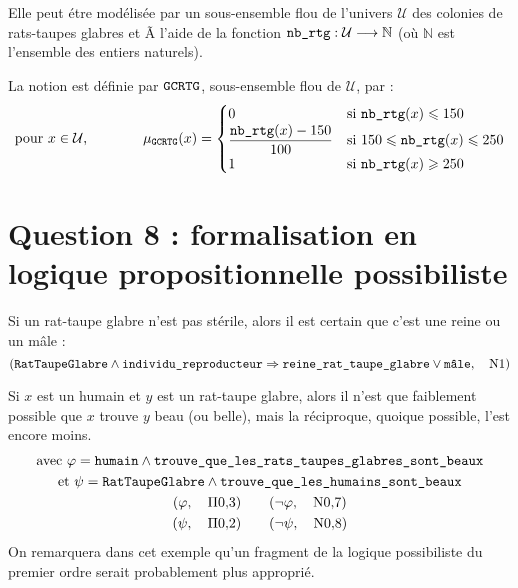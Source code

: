 \documentclass[11pt, a4paper]{article}
\def\fm#1{\text{\texttt{#1}}}
\def\limplique{\Rightarrow}
\def\Univers{{\mathcal{U}}}
\def\dans{\longrightarrow}
\def\Entiers{\mathbb{N}}
\begin{document}
	Elle peut étre modélisée par un sous-ensemble flou de l'univers $\Univers$
	des colonies de rats-taupes glabres et Ã  l'aide de la fonction
	$\nbRTG : \Univers \dans \Entiers$
	(où $\Entiers$ est l'ensemble des entiers naturels).
	
	La notion est définie par $\GCRTG$, sous-ensemble flou de $\Univers$, par :
	\begin{equation*}
	\text{pour $x\in\Univers$,}
	\qquad\qquad
	\mu_{\GCRTG}(x) =
	\begin{cases}
	0 & \text{si $\nbRTG(x) \leqslant 150$}
	\\
	\displaystyle\frac{\nbRTG(x)-150}{100}
	& \text{si $150 \leqslant \nbRTG(x) \leqslant 250$}
	\\
	1 & \text{si $\nbRTG(x) \geqslant 250$}
	\end{cases}
	\end{equation*}
	
	\section*{Question 8 : formalisation en logique propositionnelle possibiliste}
	
	Si un rat-taupe glabre n'est pas stérile, alors il est
	certain que c'est une reine ou un mâle :
	\begin{equation*}
	(\RTG \land 
	\individuReproducteur
	\limplique
	\reineRTG \lor \male,\quad
	\text{N}1)
	\end{equation*}
	
	Si $x$ est un humain et $y$ est un rat-taupe glabre,
	alors il n'est que faiblement possible que $x$ trouve $y$
	beau (ou belle), mais la réciproque, quoique possible, l'est encore
	moins.
	\begin{gather*}
	\text{avec }\varphi = \fm{humain} \land \fm{trouve\_que\_les\_rats\_taupes\_glabres\_sont\_beaux} \\
	\text{et } \psi = \RTG \land \fm{trouve\_que\_les\_humains\_sont\_beaux} \\
	(\varphi, \quad \Pi0{,}3) \qquad (\lnot\varphi, \quad \text{N}0{,}7) \\
	(\psi,    \quad \Pi0{,}2) \qquad (\lnot\psi,    \quad \text{N}0{,}8)
	\end{gather*}
	On remarquera dans cet exemple qu'un fragment de la logique
	possibiliste du premier ordre serait probablement plus approprié.
	
\end{document}

